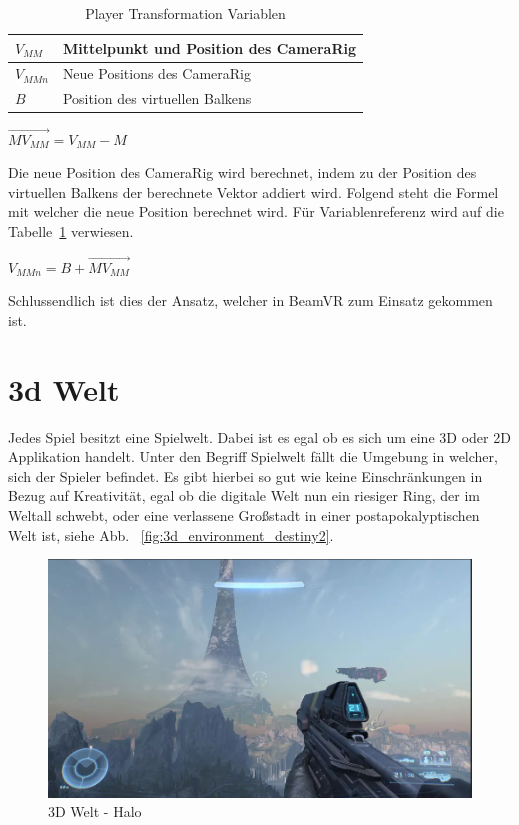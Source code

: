 \begin{table}[]
    \centering
    \begin{tabular}{|l|l|}
        \hline
        $V_{MM}$  & Mittelpunkt und Position des CameraRig                  \\ \hline
        $V_{MMn}$ & Neue Positions des CameraRig                            \\ \hline
        $B$       & Position des virtuellen Balkens                         \\ \hline
    \end{tabular}
    \caption{Player Transformation Variablen}
    \label{tab:variables_advanced}
\end{table}

$\vec{MV_{MM}} = V_{MM} - M$

Die neue Position des CameraRig wird berechnet, indem zu der Position des virtuellen Balkens der berechnete Vektor addiert wird.
Folgend steht die Formel mit welcher die neue Position berechnet wird.
Für Variablenreferenz wird auf die Tabelle~\ref{tab:variables_advanced} verwiesen.

$V_{MMn} = B + \vec{MV_{MM}}$

Schlussendlich ist dies der Ansatz, welcher in BeamVR zum Einsatz gekommen ist.

\section{3d Welt}\label{sec:3d-world}
Jedes Spiel besitzt eine Spielwelt.
Dabei ist es egal ob es sich um eine 3D oder 2D Applikation handelt.
Unter den Begriff Spielwelt fällt die Umgebung in welcher, sich der Spieler befindet.
Es gibt hierbei so gut wie keine Einschränkungen in Bezug auf Kreativität, egal ob die digitale Welt nun ein riesiger Ring, der im Weltall schwebt,
oder eine verlassene Großstadt in einer postapokalyptischen Welt ist, siehe Abb. ~\ref{fig:3d_environment_destiny2}.
~\cite{GamesRadar_HaloRing_2022}




\begin{figure}
    \centering
    \includegraphics[scale=0.4]{pics/3d_welt_halo_ring}
    \caption{3D Welt - Halo}
    \label{fig:3d_environment_halo}
\end{figure}


